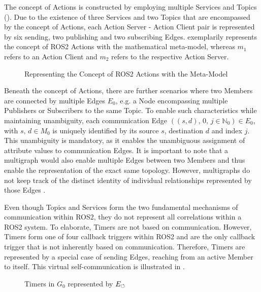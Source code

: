     The concept of Actions is constructed by employing multiple Services and Topics (). Due to the existence of three Services and two Topics that are encompassed by the concept of Actions, each Action Server - Action Client pair is represented by six sending, two publishing and two subscribing Edges.  exemplarily represents the concept of ROS2 Actions with the mathematical meta-model, whereas $m_1$ refers to an Action Client and $m_2$ refers to the respective Action Server.
    \begin{figure}[h]
        \centering
        
        \caption[Representing the Concept of ROS2 Actions with the Meta-Model]{Representing the Concept of ROS2 Actions with the Meta-Model \legend} \label{fig:tikz:mathModel:action}
    \end{figure}

    Beneath the concept of Actions, there are further scenarios where two Members are connected by multiple Edges $E_0$, e.g. a Node encompassing multiple Publishers or Subscribers to the same Topic. To enable such characteristics while maintaining unambiguity, each communication Edge $((s,d),\,{0},\,j\in \mathbb{N}_0)\in E_0$, with $s,\,d\in M_0$ is uniquely identified by its source $s$, destination $d$ and index $j$. This unambiguity is mandatory, as it enables the unambiguous assignment of attribute values to communication Edges. It is important to note that a multigraph \cite[p.~153]{multigraph} would also enable multiple Edges between two Members and thus enable the representation of the exact same topology. However, multigraphs do not keep track of the distinct identity of individual relationships represented by those Edges \cite[p.~153]{multigraph}.

    Even though Topics and Services form the two fundamental mechanisms of communication within ROS2, they do not represent all correlations within a ROS2 system. To elaborate, Timers are not based on communication. However, Timers form one of four callback triggers within ROS2 and are the only callback trigger that is not inherently based on communication. Therefore, Timers are represented by a special case of sending Edges, reaching from an active Member to itself. This virtual self-communication is illustrated in .
    \begin{figure}[h]
        \centering
        
        \caption[Timers in ROS2 Communication Graph]{Timers in $G_0$ represented by $E_{\text{$\circlearrowleft$}}$ \legend} \label{fig:tikz:mathModel:timers}
    \end{figure}

